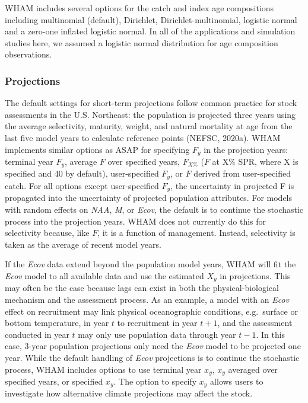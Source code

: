 \documentclass[]{article}
\begin{document}
WHAM includes several options for the catch and index age compositions
including multinomial (default), Dirichlet, Dirichlet-multinomial,
logistic normal and a zero-one inflated logistic normal. In all of the
applications and simulation studies here, we assumed a logistic normal
distribution for age composition observations.

\hypertarget{projections}{%
\subsubsection{Projections}\label{projections}}

The default settings for short-term projections follow common practice
for stock assessments in the U.S. Northeast: the population is projected
three years using the average selectivity, maturity, weight, and natural
mortality at age from the last five model years to calculate reference
points (NEFSC, 2020a). WHAM implements similar options as ASAP for
specifying \(F_y\) in the projection years: terminal year \(F_y\),
average \(F\) over specified years, \(F_{X\%}\) (\(F\) at X\% SPR, where
X is specified and 40 by default), user-specified \(F_y\), or \(F\)
derived from user-specified catch. For all options except user-specified
\(F_y\), the uncertainty in projected F is propagated into the
uncertainty of projected population attributes. For models with random
effects on \emph{NAA}, \emph{M}, or \emph{Ecov}, the default is to
continue the stochastic process into the projection years. WHAM does not
currently do this for selectivity because, like \(F\), it is a function
of management. Instead, selectivity is taken as the average of recent
model years.

If the \emph{Ecov} data extend beyond the population model years, WHAM
will fit the \emph{Ecov} model to all available data and use the
estimated \(X_y\) in projections. This may often be the case because
lags can exist in both the physical-biological mechanism and the
assessment process. As an example, a model with an \emph{Ecov} effect on
recruitment may link physical oceanographic conditions, e.g.~surface or
bottom temperature, in year \(t\) to recruitment in year \(t+1\), and
the assessment conducted in year \(t\) may only use population data
through year \(t-1\). In this case, 3-year population projections only
need the \emph{Ecov} model to be projected one year. While the default
handling of \emph{Ecov} projections is to continue the stochastic
process, WHAM includes options to use terminal year \(x_y\), \(x_y\)
averaged over specified years, or specified \(x_y\). The option to
specify \(x_y\) allows users to investigate how alternative climate
projections may affect the stock.
\end{document}
